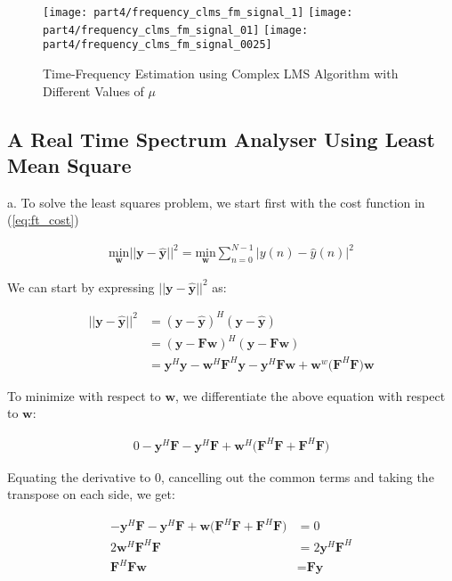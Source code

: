 \begin{figure}[H]
\centering{}
\texttt{[image: part4/frequency\_clms\_fm\_signal\_1]}
\texttt{[image: part4/frequency\_clms\_fm\_signal\_01]}
\texttt{[image: part4/frequency\_clms\_fm\_signal\_0025]}
\caption{Time-Frequency Estimation using Complex LMS Algorithm with Different Values of $\mu$}
\end{figure}

\subsection{A Real Time Spectrum Analyser Using Least Mean Square}

\noindent{}a. To solve the least squares problem, we start first with the cost function in (\ref{eq:ft_cost})

\begin{align}
\underset{\textbf{w}}{\text{min}} ||\textbf{y}-\hat{\textbf{y}}||^2 =  \underset{\textbf{w}}{\text{min}} \sum_{n=0}^{N-1}|y(n)-\hat{y}(n)|^2\label{eq:ft_cost}
\end{align}

\noindent{}We can start by expressing $||\textbf{y}-\hat{\textbf{y}}||^2$ as:

\begin{align*}
||\textbf{y}-\hat{\textbf{y}}||^2 &= (\textbf{y}-\hat{\textbf{y}})^H(\textbf{y}-\hat{\textbf{y}}) \\
&= (\textbf{y}-\textbf{F}\textbf{w})^H(\textbf{y}-\textbf{F}\textbf{w}) \\
&= \textbf{y}^H\textbf{y} - \textbf{w}^H\textbf{F}^H\textbf{y} - \textbf{y}^H\textbf{F}\textbf{w} + \textbf{w}^w\big(\textbf{F}^H\textbf{F}\big)\textbf{w}
\end{align*}

\noindent{}To minimize with respect to $\textbf{w}$, we differentiate the above equation with respect to $\textbf{w}$:

\begin{align*}
0 -\textbf{y}^H\textbf{F} - \textbf{y}^H\textbf{F} + \textbf{w}^H\big(\textbf{F}^H\textbf{F}+\textbf{F}^H\textbf{F}\big)
\end{align*}

\noindent{}Equating the derivative to 0, cancelling out the common terms and taking the transpose on each side, we get:

\begin{align*}
-\textbf{y}^H\textbf{F} - \textbf{y}^H\textbf{F} + \textbf{w}\big(\textbf{F}^H\textbf{F}+\textbf{F}^H\textbf{F}\big) &= 0 \\
2 \textbf{w}^H\textbf{F}^H\textbf{F} &= 2\textbf{y}^H\textbf{F}^H\\
\textbf{F}^H\textbf{F} \textbf{w} &= \textbf{F}\textbf{y}
\end{align*}

